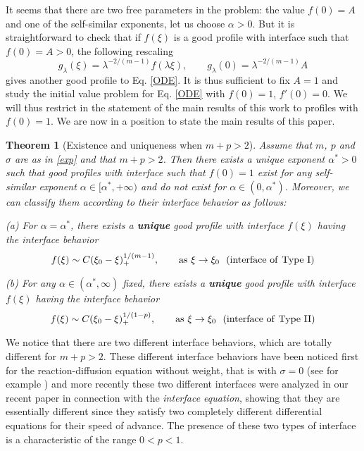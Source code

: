 \documentclass[a4paper,11pt]{article}
\newtheorem{theorem}{Theorem}[section]
\numberwithin{equation}{section}
\begin{document}
It seems that there are two free parameters in the problem: the value $f(0)=A$ and one of the self-similar exponents, let us choose $\alpha>0$. But it is straightforward to check that if $f(\xi)$ is a good profile with interface such that $f(0)=A>0$, the following rescaling
\begin{equation}\label{resc}
g_{\lambda}(\xi)=\lambda^{-2/(m-1)}f(\lambda\xi), \qquad g_{\lambda}(0)=\lambda^{-2/(m-1)}A
\end{equation}
gives another good profile to Eq. \eqref{ODE}. It is thus sufficient to fix $A=1$ and study the initial value problem for Eq. \eqref{ODE} with $f(0)=1$, $f'(0)=0$. We will thus restrict in the statement of the main results of this work to profiles with $f(0)=1$. We are now in a position to state the main results of this paper.
\begin{theorem}[Existence and uniqueness when $m+p>2$]\label{th.1}
Assume that $m$, $p$ and $\sigma$ are as in \eqref{exp} and that $m+p>2$. Then there exists a unique exponent $\alpha^*>0$ such that good profiles with interface such that $f(0)=1$ exist for any self-similar exponent $\alpha\in[\alpha^*,+\infty)$ and do not exist for $\alpha\in(0,\alpha^*)$. Moreover, we can classify them according to their interface behavior as follows:

\medskip

(a) For $\alpha=\alpha^*$, there exists a \textbf{unique} good profile with interface $f(\xi)$ having the interface behavior
\begin{equation}\label{TypeI}
f(\xi)\sim C(\xi_0-\xi)_{+}^{1/(m-1)}, \qquad {\rm as} \ \xi\to\xi_0 \ \ ({\rm interface \ of \ Type \ I})
\end{equation}

(b) For any $\alpha\in(\alpha^*,\infty)$ fixed, there exists a \textbf{unique} good profile with interface $f(\xi)$ having the interface behavior
\begin{equation}\label{TypeII}
f(\xi)\sim C(\xi_0-\xi)_{+}^{1/(1-p)}, \qquad {\rm as} \ \xi\to\xi_0 \ \ ({\rm interface \ of \ Type \ II})
\end{equation}
\end{theorem}
We notice that there are two different interface behaviors, which are totally different for $m+p>2$. These different interface behaviors have been noticed first for the reaction-diffusion equation without weight, that is with $\sigma=0$ (see for example \cite{dP94}) and more recently these two different interfaces were analyzed in our recent paper \cite{IS20b} in connection with the \emph{interface equation}, showing that they are essentially different since they satisfy two completely different differential equations for their speed of advance. The presence of these two types of interface is a characteristic of the range $0<p<1$. 
\end{document}
